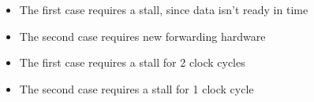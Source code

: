 \begin{frame}[fragile]
	\bigskip
	\bigskip
\BNotes\ifnum{}
\begin{itemize}
\item The first case requires a stall, since data isn't ready in time
\item The second case requires new forwarding hardware
\end{itemize}
\fi\ENotes
\end{frame}

\begin{frame}[fragile]
	\bigskip
	\bigskip
\BNotes\ifnum{}
\begin{itemize}
\item The first case requires a stall for 2 clock cycles
\item The second case requires a stall for 1 clock cycle
\end{itemize}
\fi\ENotes
\end{frame}

